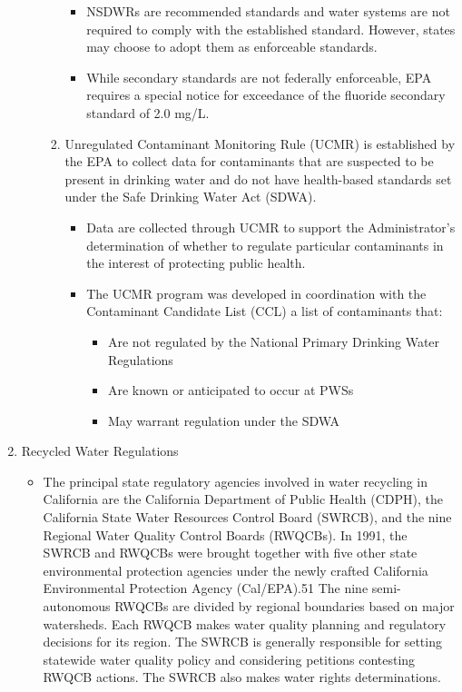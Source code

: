 \documentclass{article}
\begin{document}
\begin{enumerate}
\begin{itemize}
\begin{enumerate}
\begin{itemize}
\item NSDWRs are recommended standards and water systems are not required to comply with the established standard. However, states may choose to adopt them as enforceable standards.
\item While secondary standards are not federally enforceable, EPA requires a special notice for exceedance of the fluoride secondary standard of 2.0 mg/L.
\end{itemize}

\item Unregulated Contaminant Monitoring Rule (UCMR) is established by the EPA to collect data for contaminants that are suspected to be present in drinking water and do not have health-based standards set under the Safe Drinking Water Act (SDWA).

\begin{itemize}
\item Data are collected through UCMR to support the Administrator's determination of whether to regulate particular contaminants in the interest of protecting public health.\\

\item The UCMR program was developed in coordination with the Contaminant Candidate List (CCL) a list of contaminants that:

\begin{itemize}
\item Are not regulated by the National Primary Drinking Water Regulations
\item Are known or anticipated to occur at PWSs
\item May warrant regulation under the SDWA
\end{itemize}
\end{itemize}
\end{enumerate}
\end{itemize}

\item Recycled Water Regulations\\
\begin{itemize}
\item The principal state regulatory agencies involved in water recycling in California are the 
California Department of Public Health (CDPH), the California State Water Resources Control 
Board (SWRCB), and the nine Regional Water Quality Control Boards (RWQCBs). In 1991, the 
SWRCB and RWQCBs were brought together with five other state environmental protection 
agencies under the newly crafted California Environmental Protection Agency (Cal/EPA).51
The nine semi-autonomous RWQCBs are divided by regional boundaries based on major 
watersheds. Each RWQCB makes water quality planning and regulatory decisions for its region. 
The SWRCB is generally responsible for setting statewide water quality policy and considering 
petitions contesting RWQCB actions. The SWRCB also makes water rights determinations.\\


\end{itemize}
\end{enumerate}
\end{document}
